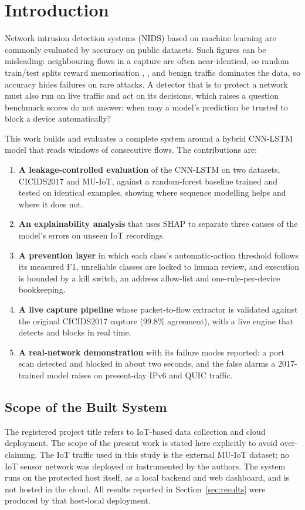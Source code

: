 \documentclass[conference]{IEEEtran}
\begin{document}
\section{Introduction}

Network intrusion detection systems (NIDS) based on machine learning are
commonly evaluated by accuracy on public datasets. Such figures can be
misleading: neighbouring flows in a capture are often near-identical, so
random train/test splits reward memorisation \cite{ref6}, \cite{ref7}, and
benign traffic dominates the data, so accuracy hides failures on rare
attacks. A detector that is to protect a network must also run on live
traffic and act on its decisions, which raises a question benchmark scores do
not answer: when may a model's prediction be trusted to block a device
automatically?

This work builds and evaluates a complete system around a hybrid CNN-LSTM
model that reads windows of consecutive flows. The contributions are:

\begin{enumerate}
\item \textbf{A leakage-controlled evaluation} of the CNN-LSTM on two
datasets, CICIDS2017 and MU-IoT, against a random-forest baseline trained and
tested on identical examples, showing where sequence modelling helps and
where it does not.
\item \textbf{An explainability analysis} that uses SHAP to separate three
causes of the model's errors on unseen IoT recordings.
\item \textbf{A prevention layer} in which each class's automatic-action
threshold follows its measured F1, unreliable classes are locked to human
review, and execution is bounded by a kill switch, an address allow-list and
one-rule-per-device bookkeeping.
\item \textbf{A live capture pipeline} whose packet-to-flow extractor is
validated against the original CICIDS2017 capture (99.8\% agreement), with a
live engine that detects and blocks in real time.
\item \textbf{A real-network demonstration} with its failure modes reported:
a port scan detected and blocked in about two seconds, and the false alarms a
2017-trained model raises on present-day IPv6 and QUIC traffic.
\end{enumerate}

\subsection*{Scope of the Built System}
The registered project title refers to IoT-based data collection and cloud
deployment. The scope of the present work is stated here explicitly to avoid
over-claiming. The IoT traffic used in this study is the external MU-IoT
dataset; no IoT sensor network was deployed or instrumented by the authors.
The system runs on the protected host itself, as a local backend and web
dashboard, and is not hosted in the cloud. All results reported in
Section~\ref{sec:results} were produced by that host-local deployment.
\end{document}
